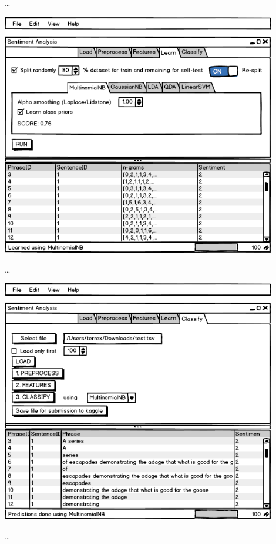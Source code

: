 \ldots

\includegraphics[width=12cm]{gui-4-learn}

\ldots

\includegraphics[width=12cm]{gui-5-classify}

\ldots
